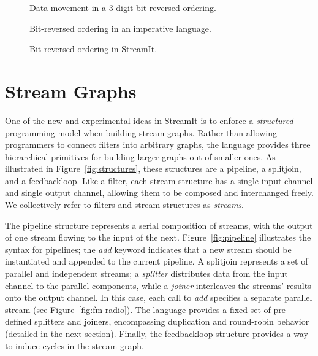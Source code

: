 \begin{figure}[t]
\centering
\begin{minipage}{2.5in}
\centering
{}
\end{minipage}
\hspace{0.5in}
\begin{minipage}{3in}
\centering
{}
\end{minipage}

\begin{minipage}{2.5in}
\caption{Data movement in a 3-digit bit-reversed ordering.\protect\label{fig:bitreverse-pattern}}
\end{minipage}
\hspace{0.5in}
\begin{minipage}{3in}
\centering
\caption{Bit-reversed ordering in an imperative language.\protect\label{fig:bitreverse-c}}
\end{minipage}

\end{figure}

\begin{figure}[t]
\centering
{}
\caption{Bit-reversed ordering in StreamIt.\protect\label{fig:bitreverse-streamit}}
\end{figure}

\section{Stream Graphs}

One of the new and experimental ideas in StreamIt is to enforce a {\it
  structured} programming model when building stream graphs.  Rather
than allowing programmers to connect filters into arbitrary graphs,
the language provides three hierarchical primitives for building
larger graphs out of smaller ones.  As illustrated in
Figure~\ref{fig:structures}, these structures are a pipeline, a
splitjoin, and a feedbackloop.  Like a filter, each stream structure
has a single input channel and single output channel, allowing them to
be composed and interchanged freely.  We collectively refer to filters
and stream structures as {\it streams}.

The pipeline structure represents a serial composition of streams,
with the output of one stream flowing to the input of the next.
Figure~\ref{fig:pipeline} illustrates the syntax for pipelines; the
{\it add} keyword indicates that a new stream should be instantiated
and appended to the current pipeline.  A splitjoin represents a set of
parallel and independent streams; a {\it splitter} distributes data
from the input channel to the parallel components, while a {\it
joiner} interleaves the streams' results onto the output channel.  In
this case, each call to {\it add} specifies a separate parallel stream
(see Figure~\ref{fig:fm-radio}).  The language provides a fixed set of
pre-defined splitters and joiners, encompassing duplication and
round-robin behavior (detailed in the next section).  Finally, the
feedbackloop structure provides a way to induce cycles in the stream
graph.

